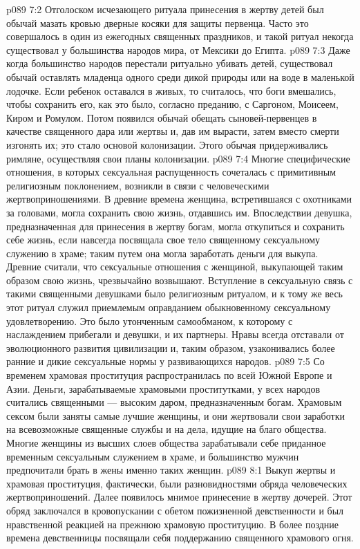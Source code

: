 \vs p089 7:2 Отголоском исчезающего ритуала принесения в жертву детей был обычай мазать кровью дверные косяки для защиты первенца. Часто это совершалось в один из ежегодных священных праздников, и такой ритуал некогда существовал у большинства народов мира, от Мексики до Египта.
\vs p089 7:3 Даже когда большинство народов перестали ритуально убивать детей, существовал обычай оставлять младенца одного среди дикой природы или на воде в маленькой лодочке. Если ребенок оставался в живых, то считалось, что боги вмешались, чтобы сохранить его, как это было, согласно преданию, с Саргоном, Моисеем, Киром и Ромулом. Потом появился обычай обещать сыновей\hyp{}первенцев в качестве священного дара или жертвы и, дав им вырасти, затем вместо смерти изгонять их; это стало основой колонизации. Этого обычая придерживались римляне, осуществляя свои планы колонизации.
\vs p089 7:4 \pc Многие специфические отношения, в которых сексуальная распущенность сочеталась с примитивным религиозным поклонением, возникли в связи с человеческими жертвоприношениями. В древние времена женщина, встретившаяся с охотниками за головами, могла сохранить свою жизнь, отдавшись им. Впоследствии девушка, предназначенная для принесения в жертву богам, могла откупиться и сохранить себе жизнь, если навсегда посвящала свое тело священному сексуальному служению в храме; таким путем она могла заработать деньги для выкупа. Древние считали, что сексуальные отношения с женщиной, выкупающей таким образом свою жизнь, чрезвычайно возвышают. Вступление в сексуальную связь с такими священными девушками было религиозным ритуалом, и к тому же весь этот ритуал служил приемлемым оправданием обыкновенному сексуальному удовлетворению. Это было утонченным самообманом, к которому с наслаждением прибегали и девушки, и их партнеры. Нравы всегда отставали от эволюционного развития цивилизации и, таким образом, узаконивались более ранние и дикие сексуальные нормы у развивающихся народов.
\vs p089 7:5 Со временем храмовая проституция распространилась по всей Южной Европе и Азии. Деньги, зарабатываемые храмовыми проститутками, у всех народов считались священными --- высоким даром, предназначенным богам. Храмовым сексом были заняты самые лучшие женщины, и они жертвовали свои заработки на всевозможные священные службы и на дела, идущие на благо общества. Многие женщины из высших слоев общества зарабатывали себе приданное временным сексуальным служением в храме, и большинство мужчин предпочитали брать в жены именно таких женщин.
\vs p089 8:1 Выкуп жертвы и храмовая проституция, фактически, были разновидностями обряда человеческих жертвоприношений. Далее появилось мнимое принесение в жертву дочерей. Этот обряд заключался в кровопускании с обетом пожизненной девственности и был нравственной реакцией на прежнюю храмовую проституцию. В более поздние времена девственницы посвящали себя поддержанию священного храмового огня.
